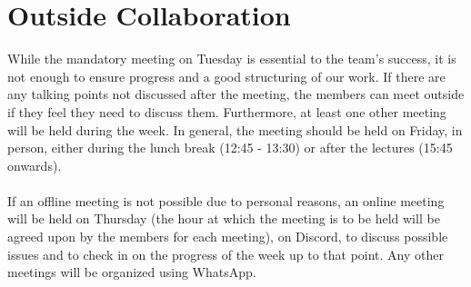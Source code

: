 \section{Outside Collaboration}
While the mandatory meeting on Tuesday is essential to the team’s success, it is not enough to ensure progress and a good structuring of our work. If there are any talking points not discussed after the meeting, the members can meet outside if they feel they need to discuss them. Furthermore, at least one other meeting will be held during the week. In general, the meeting should be held on Friday, in person, either during the lunch break (12:45 - 13:30) or after the lectures (15:45 onwards). 
\\\\
If an offline meeting is not possible due to personal reasons, an online meeting will be held on Thursday (the hour at which the meeting is to be held will be agreed upon by the members for each meeting), on Discord, to discuss possible issues and to check in on the progress of the week up to that point. Any other meetings will be organized using WhatsApp. 
